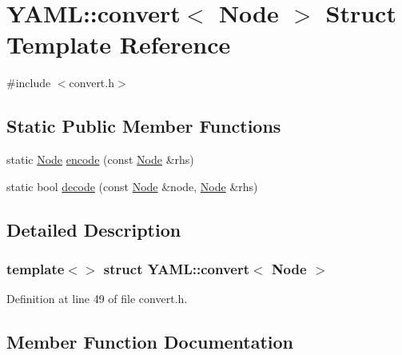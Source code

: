 \hypertarget{struct_y_a_m_l_1_1convert_3_01_node_01_4}{}\section{Y\+A\+ML\+::convert$<$ Node $>$ Struct Template Reference}
\label{struct_y_a_m_l_1_1convert_3_01_node_01_4}


{\ttfamily \#include $<$convert.\+h$>$}

\subsection*{Static Public Member Functions}
\begin{DoxyCompactItemize}
\item 
static \mbox{\hyperlink{class_y_a_m_l_1_1_node}{Node}} \mbox{\hyperlink{struct_y_a_m_l_1_1convert_3_01_node_01_4_aac5a08ab38dd161e1b24f4643f7816b8}{encode}} (const \mbox{\hyperlink{class_y_a_m_l_1_1_node}{Node}} \&rhs)
\item 
static bool \mbox{\hyperlink{struct_y_a_m_l_1_1convert_3_01_node_01_4_ac3065cda942d8930ea692c86fe5e273e}{decode}} (const \mbox{\hyperlink{class_y_a_m_l_1_1_node}{Node}} \&node, \mbox{\hyperlink{class_y_a_m_l_1_1_node}{Node}} \&rhs)
\end{DoxyCompactItemize}


\subsection{Detailed Description}
\subsubsection*{template$<$$>$\newline
struct Y\+A\+M\+L\+::convert$<$ Node $>$}



Definition at line 49 of file convert.\+h.



\subsection{Member Function Documentation}
\mbox{\label{struct_y_a_m_l_1_1convert_3_01_node_01_4_ac3065cda942d8930ea692c86fe5e273e}} 
